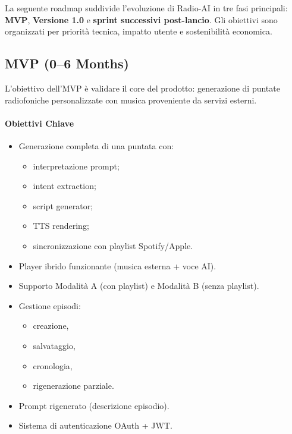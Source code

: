 \documentclass[11pt,a4paper]{article}
\begin{document}
La seguente roadmap suddivide l’evoluzione di Radio-AI in tre fasi principali:  
\textbf{MVP}, \textbf{Versione 1.0} e \textbf{sprint successivi post-lancio}.  
Gli obiettivi sono organizzati per priorità tecnica, impatto utente e sostenibilità economica.


\subsection{MVP (0--6 Months)}

L’obiettivo dell’MVP è validare il core del prodotto: generazione di puntate radiofoniche personalizzate con musica proveniente da servizi esterni.

\paragraph{Obiettivi Chiave}
\begin{itemize}
    \item Generazione completa di una puntata con:
    \begin{itemize}
        \item interpretazione prompt;
        \item intent extraction;
        \item script generator;
        \item TTS rendering;
        \item sincronizzazione con playlist Spotify/Apple.
    \end{itemize}
    \item Player ibrido funzionante (musica esterna + voce AI).
    \item Supporto Modalità A (con playlist) e Modalità B (senza playlist).
    \item Gestione episodi:
    \begin{itemize}
        \item creazione,
        \item salvataggio,
        \item cronologia,
        \item rigenerazione parziale.
    \end{itemize}
    \item Prompt rigenerato (descrizione episodio).
    \item Sistema di autenticazione OAuth + JWT.
\end{itemize}
\end{document}
